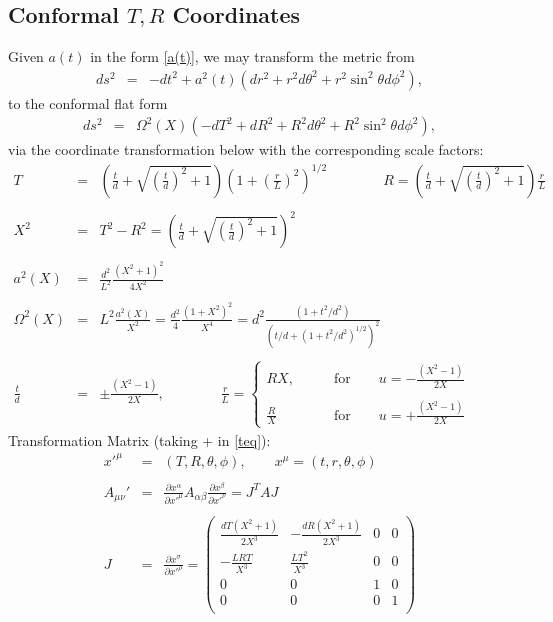 \documentclass[10pt,letterpaper]{article}
\numberwithin{equation}{section}
\begin{document}
\subsection{Conformal $T,R$ Coordinates}
Given $a(t)$ in the form \eqref{a(t)}, we may transform the metric from
\begin{eqnarray}
ds^2&=& -dt^2 + a^2(t)( dr^2 + r^2d\theta^2 + r^2\sin^2\theta d\phi^2),
\end{eqnarray}
to the conformal flat form
\begin{eqnarray}
ds^2&=& \Omega^2(X)( -dT^2+dR^2 + R^2d\theta^2 +R^2\sin^2\theta d\phi^2),
\end{eqnarray}
via the coordinate transformation below with the corresponding scale factors:
\begin{eqnarray}
T &=& \left( \frac{t}{d} + \sqrt{\left(\frac{t}{d}\right)^2+1}\right) \left(1+ \left(\frac{r}{L}\right)^2\right)^{1/2}
\qquad\qquad
R = \left( \frac{t}{d} + \sqrt{\left(\frac{t}{d}\right)^2+1}\right)\frac{r}{L}
\\ \nonumber\\
X^2 &=& T^2-R^2 = \left( \frac{t}{d} + \sqrt{\left(\frac{t}{d}\right)^2+1}\right)^2
\\ \nonumber\\
a^2(X) &=& \frac{d^2}{L^2} \frac{(X^2+1)^2}{4X^2}
\\ \nonumber\\
\Omega^2(X) &=& L^2 \frac{a^2(X)}{X^2} = \frac{d^2}{4}\frac{(1+X^2)^2}{X^4} = d^2 \frac{(1+t^2/d^2)}{(t/d+(1+t^2/d^2)^{1/2})^2}
\\ \nonumber\\
\frac{t}{d} &=& \pm\frac{(X^2-1)}{2X},\qquad\qquad 
\frac{r}{L} = 
\begin{cases}
	RX,&\qquad\text{for}\qquad u = -\frac{(X^2-1)}{2X}
\\ \\
	\frac{R}{X}&\qquad\text{for}\qquad u = +\frac{(X^2-1)}{2X}
\end{cases}
\label{teq}
\end{eqnarray}
Transformation Matrix (taking + in \eqref{teq}):
\begin{eqnarray}
x'^\mu &=& (T,R,\theta,\phi),\qquad x^\mu = (t,r,\theta,\phi)
\\ \nonumber\\
A_{\mu\nu}' &=& \frac{\partial x^\alpha}{\partial x'^\mu}A_{\alpha\beta}\frac{\partial x^\beta}{\partial x'^\nu}
= J^T A J
\\ \nonumber\\
J &=& \frac{\partial x^\sigma}{\partial x'^\rho} = 
\left(
\begin{array}{cccc}
\frac{d T \left(X^2+1\right)}{2 X^3} & -\frac{d R \left(X^2+1\right)}{2 X^3} & 0 & 0 \\
-\frac{L R T}{X^3} & \frac{L T^2}{X^3} & 0 & 0 \\
0 & 0 & 1 & 0 \\
0 & 0 & 0 & 1 \\
\end{array}
\right)
\end{eqnarray}
\end{document}
